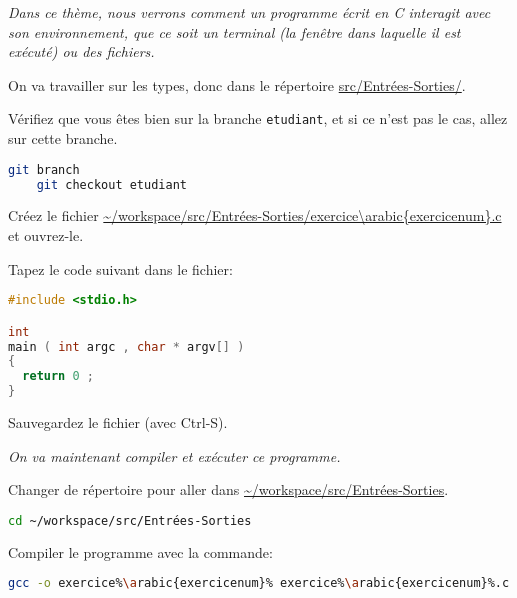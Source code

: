 \titre{\tio}


\begin{center}
  \parbox{0.9\textwidth}{%
    \sl Dans ce thème, nous verrons comment un programme écrit en C
    interagit avec son environnement, que ce soit un terminal (la
    fenêtre dans laquelle il est exécuté) ou des fichiers.
  }
\end{center}

On va travailler sur les types, donc dans le répertoire \url{src/Entrées-Sorties/}.

\question Vérifiez que vous êtes bien sur la branche
\texttt{etudiant}, et si ce n'est pas le cas, allez sur cette branche.

\begin{solution}
  \begin{lstlisting}[language=bash]
    git branch
    git checkout etudiant
  \end{lstlisting}
\end{solution}

\question Créez le fichier \url{~/workspace/src/Entrées-Sorties/exercice\arabic{exercicenum}.c} et
ouvrez-le.

\question Tapez le code suivant dans le fichier:
\begin{lstlisting}[language=C]
#include <stdio.h>

int
main ( int argc , char * argv[] )
{
  return 0 ;
}
\end{lstlisting}

\question Sauvegardez le fichier (avec Ctrl-S). 

\begin{center}
  \sl On va maintenant compiler et exécuter ce programme.
\end{center}

\question Changer de répertoire pour aller dans \url{~/workspace/src/Entrées-Sorties}.
\begin{solution}
  \begin{lstlisting}[language=bash]
    cd ~/workspace/src/Entrées-Sorties
  \end{lstlisting}
\end{solution}

\question Compiler le programme avec la commande:
\begin{solution}
  \begin{lstlisting}[language=bash]
    gcc -o exercice%\arabic{exercicenum}% exercice%\arabic{exercicenum}%.c
  \end{lstlisting}
\end{solution}

